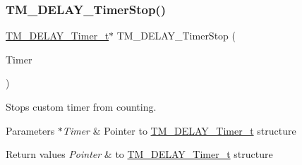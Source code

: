 \subsubsection{\texorpdfstring{T\+M\+\_\+\+D\+E\+L\+A\+Y\+\_\+\+Timer\+Stop()}{TM\_DELAY\_TimerStop()}}
{\footnotesize\ttfamily \hyperlink{group___t_m___d_e_l_a_y___typedefs_gaf0beeb077a757f34c8b176464d9a0e85}{T\+M\+\_\+\+D\+E\+L\+A\+Y\+\_\+\+Timer\+\_\+t}$\ast$ T\+M\+\_\+\+D\+E\+L\+A\+Y\+\_\+\+Timer\+Stop (\begin{DoxyParamCaption}\item[{\hyperlink{group___t_m___d_e_l_a_y___typedefs_gaf0beeb077a757f34c8b176464d9a0e85}{T\+M\+\_\+\+D\+E\+L\+A\+Y\+\_\+\+Timer\+\_\+t} $\ast$}]{Timer }\end{DoxyParamCaption})}



Stops custom timer from counting. 


\begin{DoxyParams}{Parameters}
{\em $\ast$\+Timer} & Pointer to \hyperlink{group___t_m___d_e_l_a_y___typedefs_gaf0beeb077a757f34c8b176464d9a0e85}{T\+M\+\_\+\+D\+E\+L\+A\+Y\+\_\+\+Timer\+\_\+t} structure \\
\hline
\end{DoxyParams}

\begin{DoxyRetVals}{Return values}
{\em Pointer} & to \hyperlink{group___t_m___d_e_l_a_y___typedefs_gaf0beeb077a757f34c8b176464d9a0e85}{T\+M\+\_\+\+D\+E\+L\+A\+Y\+\_\+\+Timer\+\_\+t} structure \\
\hline
\end{DoxyRetVals}
